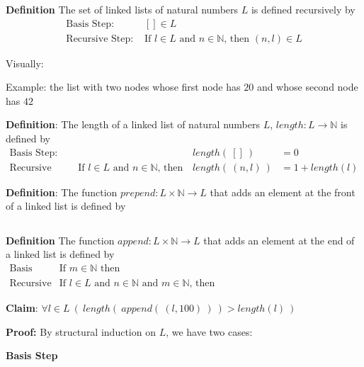 \documentclass[12pt, oneside]{article}
\begin{document}
{\bf Definition} The set of linked lists of natural numbers $L$ is defined recursively by
\[
\begin{array}{ll}
    \textrm{Basis Step: } & [] \in L \\
    \textrm{Recursive Step: } & \textrm{If } l \in L\textrm{ and }n \in \mathbb{N} \textrm{, then } (n, l) \in L
\end{array}
\] 

Visually:

\vspace{50pt}

Example: the list with two nodes whose first node has $20$ and whose second node
has $42$

\vspace{50pt} 

{\bf Definition}: The length of a linked list of natural numbers $L$, $length: L \to \mathbb{N}$ is defined by
\[
\begin{array}{llll}
\textrm{Basis Step:} &  & length(~[]~) &= 0 \\
\textrm{Recursive Step:} & \textrm{If } l \in L\textrm{ and }n \in \mathbb{N}\textrm{, then  } & length(~(n, l)~)  &= 1+ length(l)
\end{array}
\]
 \vspace{50pt}


{\bf Definition}: The function $prepend : L \times \mathbb{N} \to L$ that adds an element at the 
front of a linked list is defined by
\[
\phantom{prepend(~(l, n)~) = (n, l)}
\]
 \vspace{50pt}


{\bf Definition} The function $append : L \times \mathbb{N} \to L$ that 
adds an element at the end of a linked list is defined by
\[
\begin{array}{llll}
\textrm{Basis Step:} & \textrm{If } m \in \mathbb{N}\textrm{ then } & \phantom{append(~([], m)~)} & \phantom{= (m, []) }\\
\textrm{Recursive Step:} & \textrm{If } l \in L\textrm{ and }n \in \mathbb{N}\textrm{ and }m \in \mathbb{N}\textrm{, then  } & \phantom{append(~(~(n, l), m~)~) } &\phantom{= (n, append(~(l, m)~)~)}
\end{array}
\] \vspace{50pt}
\newpage


{\bf Claim}: $\forall l \in L ~ (~length(~append(~(l, 100)~)~) > length(l)~)$

{\bf Proof:} By structural induction on $L$, we have two cases:

{\bf Basis Step}
\end{document}
